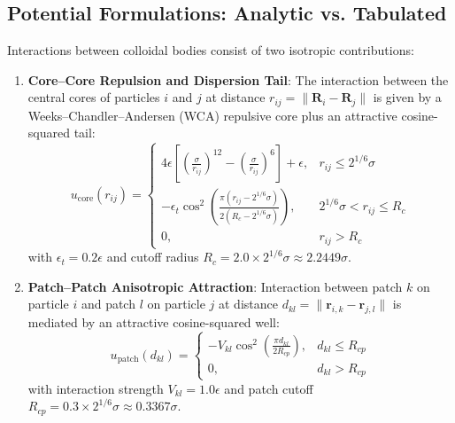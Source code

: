 \documentclass[11pt,a4paper]{article}
\begin{document}
\subsection{Potential Formulations: Analytic vs. Tabulated}

Interactions between colloidal bodies consist of two isotropic contributions:
\begin{enumerate}
    \item \textbf{Core--Core Repulsion and Dispersion Tail}:
    The interaction between the central cores of particles $i$ and $j$ at distance $r_{ij} = \|\mathbf{R}_i - \mathbf{R}_j\|$ is given by a Weeks--Chandler--Andersen (WCA) repulsive core plus an attractive cosine-squared tail:
    \begin{equation}
    u_{\mathrm{core}}(r_{ij}) = \begin{cases}
    4\epsilon \left[\left(\frac{\sigma}{r_{ij}}\right)^{12} - \left(\frac{\sigma}{r_{ij}}\right)^6\right] + \epsilon, & r_{ij} \le 2^{1/6}\sigma \\
    -\epsilon_t \cos^2\left(\frac{\pi (r_{ij} - 2^{1/6}\sigma)}{2(R_c - 2^{1/6}\sigma)}\right), & 2^{1/6}\sigma < r_{ij} \le R_c \\
    0, & r_{ij} > R_c
    \end{cases}
    \end{equation}
    with $\epsilon_t = 0.2\epsilon$ and cutoff radius $R_c = 2.0 \times 2^{1/6}\sigma \approx 2.2449\sigma$.
    \item \textbf{Patch--Patch Anisotropic Attraction}:
    Interaction between patch $k$ on particle $i$ and patch $l$ on particle $j$ at distance $d_{kl} = \|\mathbf{r}_{i,k} - \mathbf{r}_{j,l}\|$ is mediated by an attractive cosine-squared well:
    \begin{equation}
    u_{\mathrm{patch}}(d_{kl}) = \begin{cases}
    -V_{kl} \cos^2\left(\frac{\pi d_{kl}}{2 R_{cp}}\right), & d_{kl} \le R_{cp} \\
    0, & d_{kl} > R_{cp}
    \end{cases}
    \end{equation}
    with interaction strength $V_{kl} = 1.0\epsilon$ and patch cutoff $R_{cp} = 0.3 \times 2^{1/6}\sigma \approx 0.3367\sigma$.
\end{enumerate}
\end{document}
